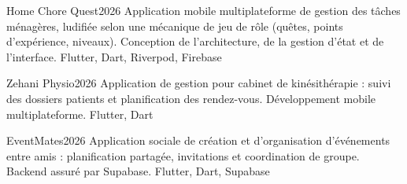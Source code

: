 %
%
%


\begin{projects}
	\project
		{Home Chore Quest}{2026}
		{}
		{Application mobile multiplateforme de gestion des tâches ménagères, ludifiée selon une mécanique de jeu de rôle (quêtes, points d'expérience, niveaux). Conception de l'architecture, de la gestion d'état et de l'interface.}
		{Flutter, Dart, Riverpod, Firebase}

	\project
		{Zehani Physio}{2026}
		{}
		{Application de gestion pour cabinet de kinésithérapie : suivi des dossiers patients et planification des rendez-vous. Développement mobile multiplateforme.}
		{Flutter, Dart}

	\project
		{EventMates}{2026}
		{}
		{Application sociale de création et d'organisation d'événements entre amis : planification partagée, invitations et coordination de groupe. Backend assuré par Supabase.}
		{Flutter, Dart, Supabase}
\end{projects}
